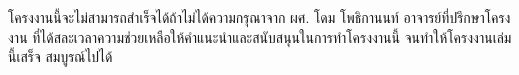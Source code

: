 \begin{acknowledgments}
\par
โครงงานนี้จะไม่สามารถสำเร็จได้ถ้าไม่ได้ความกรุณาจาก ผศ. โดม โพธิกานนท์ อาจารย์ที่ปรึกษาโครงงาน ที่ได้สละเวลาความช่วยเหลือให้คำแนะนำและสนับสนุนในการทำโครงงานนี้ จนทำให้โครงงานเล่มนี้เสร็จ สมบูรณ์ไปได้
\end{acknowledgments}%
\fi %

\contentspage

\ifproject
\figurelistpage

\tablelistpage
\fi %



